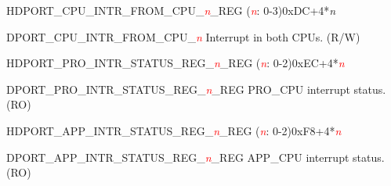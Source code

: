 \begin{register}{H}{DPORT\_CPU\_INTR\_FROM\_CPU\_\textcolor{red}{\it{n}}\_REG (\textcolor{red}{\it{n}}: 0-3)}{0xDC+4*\textit{n}}\label{regdesc:CPUINTRFROMCPUnREG}
%
%
\regnewline%
\begin{regdesc}\begin{reglist}
\item [DPORT\_CPU\_INTR\_FROM\_CPU\_\textcolor{red}{\textcolor{red}{\it{n}}}]Interrupt in both CPUs. (R/W)
\end{reglist}\end{regdesc}
\end{register}


\begin{register}{H}{DPORT\_PRO\_INTR\_STATUS\_REG\_\textcolor{red}{\it{n}}\_REG (\textcolor{red}{\it{n}}: 0-2)}{0xEC+4*\textcolor{red}{\it{n}}}\label{regdesc:PROINTRSTATUSREGnREG}
%
\regnewline%
\begin{regdesc}\begin{reglist}
\item [DPORT\_PRO\_INTR\_STATUS\_REG\_\textcolor{red}{\textcolor{red}{\it{n}}}\_REG]PRO\_CPU interrupt status. (RO)
\end{reglist}\end{regdesc}
\end{register}


\begin{register}{H}{DPORT\_APP\_INTR\_STATUS\_REG\_\textcolor{red}{\it{n}}\_REG (\textcolor{red}{\it{n}}: 0-2)}{0xF8+4*\textcolor{red}{\it{n}}}\label{regdesc:APPINTRSTATUSREGnREG}
%
\regnewline%
\begin{regdesc}\begin{reglist}
\item [DPORT\_APP\_INTR\_STATUS\_REG\_\textcolor{red}{\textcolor{red}{\it{n}}}\_REG]APP\_CPU interrupt status. (RO)
\end{reglist}\end{regdesc}
\end{register}


